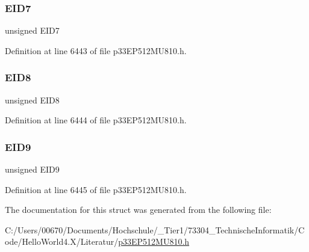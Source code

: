 \subsubsection{\texorpdfstring{E\+I\+D7}{EID7}}
{\footnotesize\ttfamily unsigned E\+I\+D7}



Definition at line 6443 of file p33\+E\+P512\+M\+U810.\+h.

\mbox{\label{structtag_c2_r_x_f4_e_i_d_b_i_t_s_acca25e0b7d86eb499d01f85222baea87}} 
\subsubsection{\texorpdfstring{E\+I\+D8}{EID8}}
{\footnotesize\ttfamily unsigned E\+I\+D8}



Definition at line 6444 of file p33\+E\+P512\+M\+U810.\+h.

\mbox{\label{structtag_c2_r_x_f4_e_i_d_b_i_t_s_ac6748f73d4ada8538b06548be4f396c2}} 
\subsubsection{\texorpdfstring{E\+I\+D9}{EID9}}
{\footnotesize\ttfamily unsigned E\+I\+D9}



Definition at line 6445 of file p33\+E\+P512\+M\+U810.\+h.



The documentation for this struct was generated from the following file\+:\begin{DoxyCompactItemize}
\item 
C\+:/\+Users/00670/\+Documents/\+Hochschule/\+\_\+\+Tier1/73304\+\_\+\+Technische\+Informatik/\+Code/\+Hello\+World4.\+X/\+Literatur/\hyperlink{p33_e_p512_m_u810_8h}{p33\+E\+P512\+M\+U810.\+h}\end{DoxyCompactItemize}

